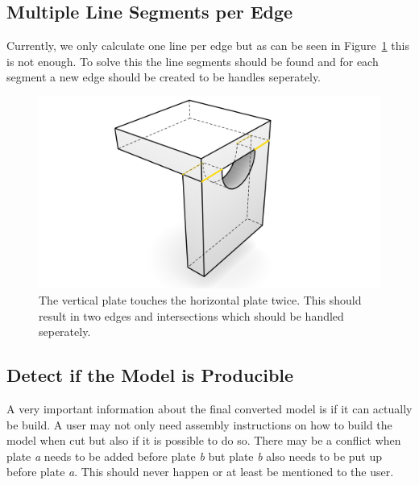 \documentclass[../ClassicThesis.tex]{subfiles}
\begin{document}
\subsection{Multiple Line Segments per Edge}
Currently, we only calculate one line per edge but as can be seen in Figure~\ref{fig:twoLineSegments} this is not enough. To solve this the line segments should be found and for each segment a new edge should be created to be handles seperately. 
\begin{figure}[!ht]
\centering
\includegraphics[width=\columnwidth]{Images/Blocks_two_contact.png}
\caption{The vertical plate touches the horizontal plate twice. This should result in two edges and intersections which should be handled seperately.}
\label{fig:twoLineSegments}
\end{figure}

\subsection{Detect if the Model is Producible}
A very important information about the final converted model is if it can actually be build. A user may not only need assembly instructions on how to build the model when cut but also if it is possible to do so. There may be a conflict when plate \emph{a} needs to be added before plate \emph{b} but plate \emph{b} also needs to be put up before plate \emph{a}. This should never happen or at least be mentioned to the user.
\end{document}
